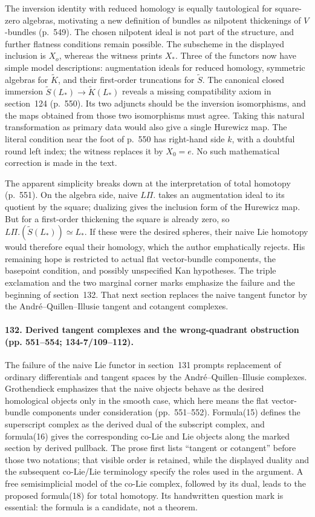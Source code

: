 The inversion identity with reduced homology is equally tautological for square-zero algebras, motivating a new definition of bundles as nilpotent thickenings of $V$-bundles (p.~549). The chosen nilpotent ideal is not part of the structure, and further flatness conditions remain possible. The subscheme in the displayed inclusion is $X_o$, whereas the witness prints $X_*$. Three of the functors now have simple model descriptions: augmentation ideals for reduced homology, symmetric algebras for $\widetilde K$, and their first-order truncations for $\widetilde S$. The canonical closed immersion $\widetilde S(L_*)\to\widetilde K(L_*)$ reveals a missing compatibility axiom in section~124 (p.~550). Its two adjuncts should be the inversion isomorphisms, and the maps obtained from those two isomorphisms must agree. Taking this natural transformation as primary data would also give a single Hurewicz map. The literal condition near the foot of p.~550 has right-hand side $k$, with a doubtful round left index; the witness replaces it by $X_0=e$. No such mathematical correction is made in the text.

The apparent simplicity breaks down at the interpretation of total homotopy (p.~551). On the algebra side, naive $L\Pi.$ takes an augmentation ideal to its quotient by the square; dualizing gives the inclusion form of the Hurewicz map. But for a first-order thickening the square is already zero, so $L\Pi.(\widetilde S(L_*))\simeq L_*$. If these were the desired spheres, their naive Lie homotopy would therefore equal their homology, which the author emphatically rejects. His remaining hope is restricted to actual flat vector-bundle components, the basepoint condition, and possibly unspecified Kan hypotheses. The triple exclamation and the two marginal corner marks emphasize the failure and the beginning of section~132. That next section replaces the naive tangent functor by the Andr\'e--Quillen--Illusie tangent and cotangent complexes.

\paragraph{132. Derived tangent complexes and the wrong-quadrant obstruction (pp. 551--554; 134-7/109--112).}
The failure of the naive Lie functor in section~131 prompts replacement of ordinary differentials and tangent spaces by the Andr\'e--Quillen--Illusie complexes. Grothendieck emphasizes that the naive objects behave as the desired homological objects only in the smooth case, which here means the flat vector-bundle components under consideration (pp.~551--552). Formula(15) defines the superscript complex as the derived dual of the subscript complex, and formula(16) gives the corresponding co-Lie and Lie objects along the marked section by derived pullback. The prose first lists ``tangent or cotangent'' before those two notations; that visible order is retained, while the displayed duality and the subsequent co-Lie/Lie terminology specify the roles used in the argument. A free semisimplicial model of the co-Lie complex, followed by its dual, leads to the proposed formula(18) for total homotopy. Its handwritten question mark is essential: the formula is a candidate, not a theorem.

